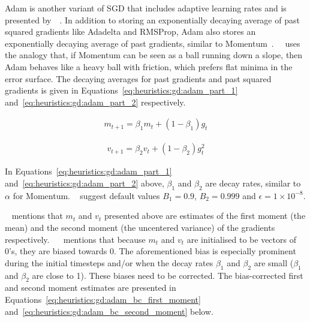 \Acf{Adam} is another variant of \acs{SGD} that includes adaptive learning rates and is presented by~\citeauthor{ref:kingma:2014}~\cite{ref:kingma:2014}. In addition to storing an exponentially decaying average of past squared gradients like \acs{Adadelta} and \acs{RMSProp}, \acs{Adam} also stores an exponentially decaying average of past gradients, similar to \acs{Momentum}~\cite{ref:ruder:2016}.~\citeauthor{ref:heusel:2017}~\cite{ref:heusel:2017} uses the analogy that, if \acs{Momentum} can be seen as a ball running down a slope, then \acs{Adam} behaves like a heavy ball with friction, which prefers flat minima in the error surface. The decaying averages for past gradients and past squared gradients is given in Equations~\eqref{eq:heuristics:gd:adam_part_1} and~\eqref{eq:heuristics:gd:adam_part_2} respectively.

\begin{equation}
      \label{eq:heuristics:gd:adam_part_1}
      \begin{split}
            m_{t+1} = \beta_{1}m_{t} + (1 - \beta_{1})g_{t}
      \end{split}
\end{equation}

\begin{equation}
      \label{eq:heuristics:gd:adam_part_2}
      \begin{split}
            v_{t+1} = \beta_{2}v_{t} + (1 - \beta_{2})g^{2}_{t}
      \end{split}
\end{equation}

\noindent
In Equations~\eqref{eq:heuristics:gd:adam_part_1} and~\eqref{eq:heuristics:gd:adam_part_2} above, $\beta_{1}$ and $\beta_{2}$ are decay rates, similar to $\alpha$ for \acs{Momentum}. \citeauthor{ref:kingma:2014}~\cite{ref:kingma:2014} suggest default values $B_{1}=0.9$, $B_{2}=0.999$ and $\epsilon = 1 \times 10^{-8}$.

\citeauthor{ref:ruder:2016}~\cite{ref:ruder:2016} mentions that $m_{t}$ and $v_{t}$ presented above are estimates of the first moment (the mean) and the second moment (the uncentered variance) of the gradients respectively. ~\citeauthor{ref:kingma:2014}~\cite{ref:kingma:2014} mentions that because $m_{t}$ and $v_{t}$ are initialised to be vectors of 0's, they are biased towards 0. The aforementioned bias is especially prominent during the initial timesteps and/or when the decay rates $\beta_{1}$ and $\beta_{2}$ are small ($\beta_{1}$ and $\beta_{2}$ are close to 1). These biases need to be corrected. The bias-corrected first and second moment estimates are presented in Equations~\eqref{eq:heuristics:gd:adam_bc_first_moment} and~\eqref{eq:heuristics:gd:adam_bc_second_moment} below.

